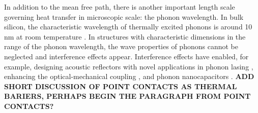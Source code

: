 



In addition to the mean free path, there is another important length scale governing heat transfer in microscopic scale: the phonon wavelength. In bulk silicon, the characteristic wavelength of thermally excited phonons is around 10 nm at room temperature \cite{ju99}. In structures with characteristic dimensions in the range of the phonon wavelength, the wave properties of phonons cannot be neglected and interference effects appear. Interference effects have enabled, for example, designing acoustic reflectors with novel applications in phonon lasing \cite{maryam13}, enhancing the optical-mechanical coupling \cite{fainstein13}, and phonon nanocapacitors \cite{han15}. \textbf{ADD SHORT DISCUSSION OF POINT CONTACTS AS THERMAL BARIERS, PERHAPS BEGIN THE PARAGRAPH FROM POINT CONTACTS?}

